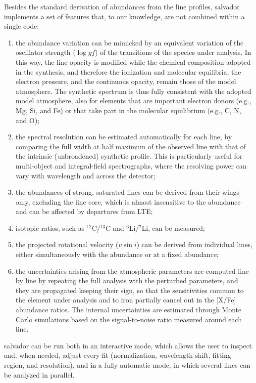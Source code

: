 \documentclass{aa}
\newcommand{\salvador}{salvador}   %
\begin{document}
Besides the standard derivation of abundances from the line profiles,
\salvador{} implements a set of features that, to our knowledge, are
not combined within a single code:
\begin{enumerate}
\item the abundance variation can be mimicked by an equivalent
variation of the oscillator strength ($\log gf$) of the transitions of
the species under analysis. In this way, the line opacity is modified
while the chemical composition adopted in the synthesis, and therefore
the ionization and molecular equilibria, the electron pressure, and
the continuous opacity, remain those of the model atmosphere. The
synthetic spectrum is thus fully consistent with the adopted model
atmosphere, also for elements that are important electron donors
(e.g., Mg, Si, and Fe) or that take part in the molecular equilibrium
(e.g., C, N, and O);
\item the spectral resolution can be estimated automatically for each
line, by comparing the full width at half maximum of the observed
line with that of the intrinsic (unbroadened) synthetic profile. This
is particularly useful for multi-object and integral-field
spectrographs, where the resolving power can vary with wavelength and
across the detector;
\item the abundances of strong, saturated lines can be derived from
their wings only, excluding the line core, which is almost
insensitive to the abundance and can be affected by departures from
LTE;
\item isotopic ratios, such as $^{12}$C/$^{13}$C and
$^{6}$Li/$^{7}$Li, can be measured;
\item the projected rotational velocity ($v\sin i$) can be derived
from individual lines, either simultaneously with the abundance or at
a fixed abundance;
\item the uncertainties arising from the atmospheric parameters are
computed line by line by repeating the full analysis with the
perturbed parameters, and they are propagated keeping their sign, so
that the sensitivities common to the element under analysis and to
iron partially cancel out in the [X/Fe] abundance ratios. The internal
uncertainties are estimated through Monte Carlo simulations based on
the signal-to-noise ratio measured around each line.
\end{enumerate}
\salvador{} can be run both in an interactive mode, which allows the
user to inspect and, when needed, adjust every fit (normalization,
wavelength shift, fitting region, and resolution), and in a fully
automatic mode, in which several lines can be analyzed in parallel.
\end{document}
